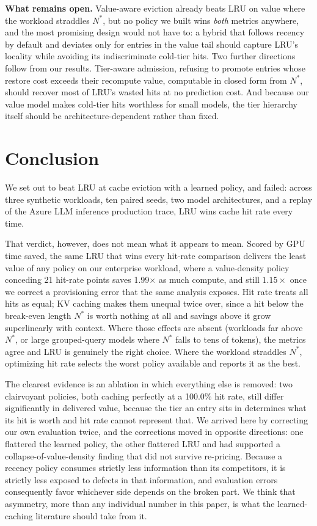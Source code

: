 \documentclass[letterpaper,twocolumn,10pt]{article}
\begin{document}
\textbf{What remains open.} Value-aware eviction already beats LRU on value where the workload straddles $N^{*}$, but no policy we built wins \emph{both} metrics anywhere, and the most promising design would not have to: a hybrid that follows recency by default and deviates only for entries in the value tail should capture LRU's locality while avoiding its indiscriminate cold-tier hits. Two further directions follow from our results. Tier-aware admission, refusing to promote entries whose restore cost exceeds their recompute value, computable in closed form from $N^{*}$, should recover most of LRU's wasted hits at no prediction cost. And because our value model makes cold-tier hits worthless for small models, the tier hierarchy itself should be architecture-dependent rather than fixed.

\section{Conclusion}

We set out to beat LRU at cache eviction with a learned policy, and failed: across three synthetic workloads, ten paired seeds, two model architectures, and a replay of the Azure LLM inference production trace, LRU wins cache hit rate every time.

That verdict, however, does not mean what it appears to mean. Scored by GPU time saved, the same LRU that wins every hit-rate comparison delivers the least value of any policy on our enterprise workload, where a value-density policy conceding 21 hit-rate points saves 1.99$\times$ as much compute, and still $1.15\times$ once we correct a provisioning error that the same analysis exposes. Hit rate treats all hits as equal; KV caching makes them unequal twice over, since a hit below the break-even length $N^{*}$ is worth nothing at all and savings above it grow superlinearly with context. Where those effects are absent (workloads far above $N^{*}$, or large grouped-query models where $N^{*}$ falls to tens of tokens), the metrics agree and LRU is genuinely the right choice. Where the workload straddles $N^{*}$, optimizing hit rate selects the worst policy available and reports it as the best.

The clearest evidence is an ablation in which everything else is removed: two clairvoyant policies, both caching perfectly at a 100.0\% hit rate, still differ significantly in delivered value, because the tier an entry sits in determines what its hit is worth and hit rate cannot represent that. We arrived here by correcting our own evaluation twice, and the corrections moved in opposite directions: one flattered the learned policy, the other flattered LRU and had supported a collapse-of-value-density finding that did not survive re-pricing. Because a recency policy consumes strictly less information than its competitors, it is strictly less exposed to defects in that information, and evaluation errors consequently favor whichever side depends on the broken part. We think that asymmetry, more than any individual number in this paper, is what the learned-caching literature should take from it.
\end{document}

